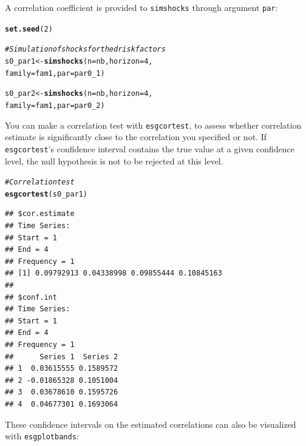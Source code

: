 \documentclass[a4paper]{article}\usepackage[]{graphicx}\usepackage[]{color}
\makeatletter
\newcommand{\hlnum}[1]{\textcolor[rgb]{0.686,0.059,0.569}{#1}}%
\newcommand{\hlcom}[1]{\textcolor[rgb]{0.678,0.584,0.686}{\textit{#1}}}%
\newcommand{\hlstd}[1]{\textcolor[rgb]{0.345,0.345,0.345}{#1}}%
\newcommand{\hlkwb}[1]{\textcolor[rgb]{0.69,0.353,0.396}{#1}}%
\newcommand{\hlkwc}[1]{\textcolor[rgb]{0.333,0.667,0.333}{#1}}%
\newcommand{\hlkwd}[1]{\textcolor[rgb]{0.737,0.353,0.396}{\textbf{#1}}}%
\newenvironment{kframe}{%
 \def\at@end@of@kframe{}%
 \ifinner\ifhmode%
  \def\at@end@of@kframe{\end{minipage}}%
  \begin{minipage}{\columnwidth}%
 \fi\fi%
 \def\FrameCommand##1{\hskip\@totalleftmargin \hskip-\fboxsep
 \colorbox{shadecolor}{##1}\hskip-\fboxsep
     \hskip-\linewidth \hskip-\@totalleftmargin \hskip\columnwidth}%
 \MakeFramed {\advance\hsize-\width
   \@totalleftmargin\z@ \linewidth\hsize
   \@setminipage}}%
 {\par\unskip\endMakeFramed%
 \at@end@of@kframe}
\newenvironment{knitrout}{}{} %
\newcommand{\code}[1]{\mbox{\texttt{#1}}}
\makeatother
\begin{document}
A correlation coefficient is provided to \code{simshocks} through argument \code{par}:

\begin{knitrout}
\color{fgcolor}\begin{kframe}
\begin{alltt}
\hlkwd{set.seed}\hlstd{(}\hlnum{2}\hlstd{)}

\hlcom{# Simulation of shocks for the d risk factors}
\hlstd{s0_par1} \hlkwb{<-} \hlkwd{simshocks}\hlstd{(}\hlkwc{n} \hlstd{= nb,} \hlkwc{horizon} \hlstd{=} \hlnum{4}\hlstd{,}
\hlkwc{family} \hlstd{= fam1,} \hlkwc{par} \hlstd{= par0_1)}

\hlstd{s0_par2} \hlkwb{<-} \hlkwd{simshocks}\hlstd{(}\hlkwc{n} \hlstd{= nb,} \hlkwc{horizon} \hlstd{=} \hlnum{4}\hlstd{,}
\hlkwc{family} \hlstd{= fam1,} \hlkwc{par} \hlstd{= par0_2)}
\end{alltt}
\end{kframe}
\end{knitrout}

You can make a correlation test with \code{esgcortest}, to assess whether correlation estimate is significantly close to the correlation you specified or not. If \code{esgcortest}'s confidence interval contains the true value at a given confidence level, the null hypothesis is not to be rejected at this level. 


\begin{knitrout}
\color{fgcolor}\begin{kframe}
\begin{alltt}
\hlcom{# Correlation test}
\hlkwd{esgcortest}\hlstd{(s0_par1)}
\end{alltt}
\begin{verbatim}
## $cor.estimate
## Time Series:
## Start = 1 
## End = 4 
## Frequency = 1 
## [1] 0.09792913 0.04338998 0.09855444 0.10845163
## 
## $conf.int
## Time Series:
## Start = 1 
## End = 4 
## Frequency = 1 
##      Series 1  Series 2
## 1  0.03615555 0.1589572
## 2 -0.01865328 0.1051004
## 3  0.03678610 0.1595726
## 4  0.04677301 0.1693064
\end{verbatim}
\end{kframe}
\end{knitrout}

These confidence intervals on the estimated correlations can also be visualized with \code{esgplotbands}:  
\end{document}
